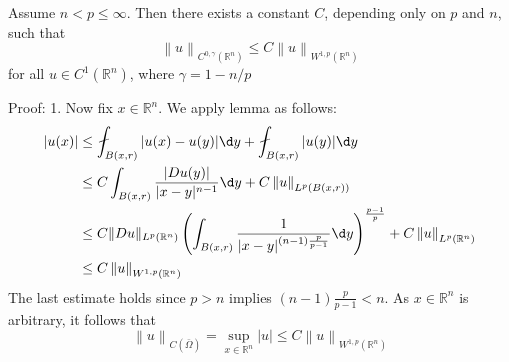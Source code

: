 \begin{theorem}
    Assume $n<p \leq \infty$. Then there exists a constant $C$, depending only on $p$ and $n$, such that
    \begin{equation*}
        \left\|u\right\|_{C^{0, \gamma}\left(\mathbb{R}^n\right)} \leq C\left\|u\right\|_{W^{1, p}\left(\mathbb{R}^n\right)}
    \end{equation*}
    for all $u \in C^1\left(\mathbb{R}^n\right)$, where $
        \gamma= 1-n / p $

    Proof:
    1. Now fix $x \in \mathbb{R}^n$. We apply lemma as follows:
    $$
        \begin{aligned}
            \left|u(x)\right| & \leq \fint_{B(x, r)}|u(x)-u(y)| \d  y+ \fint_{B(x, r)}|u(y)| \d  y                                                   \\
                              & \leq C \int_{B(x, r)} \frac{|D u(y)|}{|x-y|^{n-1}} \d  y+C\left\|u\right\|_{L^p(B(x, r))}                            \\
                              & \leq C \|Du\|_{L^p(\mathbb{R}^n)}
            \left(\int_{B(x, r)} \frac{1}{|x-y|^{(n-1)\frac{p}{p-1}}}  \d  y\right)^{\frac{p-1}{p}}+C\left\|u\right\|_{L^p\left(\mathbb{R}^n\right)} \\
                              & \leq C\left\|u\right\|_{W^{1, p}\left(\mathbb{R}^n\right)}
        \end{aligned}
    $$
    The last estimate holds since $p>n$ implies $(n-1) \frac{p}{p-1}<n$.
    As $x \in \mathbb{R}^n$ is arbitrary, it follows that
    $$
        \left\|u\right\|_{C(\bar{\Omega})}
        =
        \sup _{x\in \mathbb{R}^n}|u|
        \leq
        C\left\|u\right\|_{W^{1, p}\left(\mathbb{R}^n\right)}
    $$


\end{theorem}
